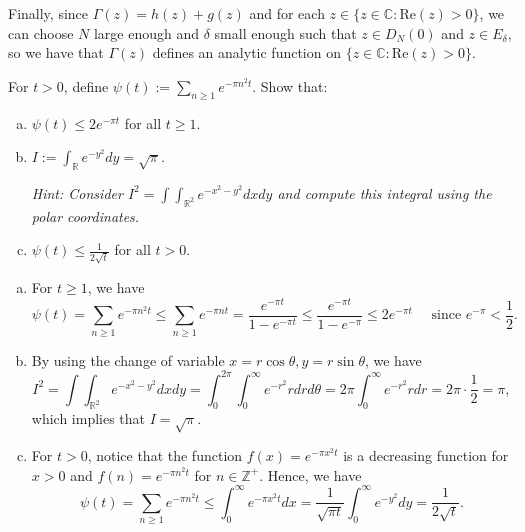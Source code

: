 \documentclass{elegantbook}
\begin{document}
\begin{problemset}[Exercises]
\begin{solution}
    Finally, since $\Gamma(z) = h(z) + g(z)$ and for each $z\in\{z\in\mathbb{C} : \mathrm{Re}(z) > 0\}$, we can choose $N$ large enough and $\delta$ small enough such that $z\in D_{N}(0)$ and $z\in E_{\delta}$, so we have that $\Gamma(z)$ defines an analytic function on $\{z\in\mathbb{C} : \mathrm{Re}(z) > 0\}$.
  \end{solution}

  \item For $t>0$, define $\psi(t) := \sum_{n\geq 1}e^{-\pi n^2 t}$. Show that:
  \begin{enumerate}[(a)]
    \item $\psi(t) \leq 2e^{-\pi t}$ for all $t\geq1$.
    \item $I := \int_{\mathbb{R}} e^{-y^2} dy = \sqrt{\pi}$.
    
    \textit{Hint: Consider $I^2=\int\int_{\mathbb{R}^2} e^{-x^2-y^2} dx dy$ and compute this integral using the polar coordinates.}
    
    \item $\psi(t) \leq \frac{1}{2\sqrt{t}}$ for all $t>0$.
  \end{enumerate}

  \begin{solution}
    \begin{enumerate}[(a)]
      \item For $t\geq 1$, we have
      \[
        \psi(t) = \sum_{n\geq 1}e^{-\pi n^2 t} \leq \sum_{n\geq 1}e^{-\pi n t} = \frac{e^{-\pi t}}{1-e^{-\pi t}} \leq \frac{e^{-\pi t}}{1-e^{-\pi}} \leq 2e^{-\pi t} \quad \text{ since } e^{-\pi} < \frac{1}{2}.
      \]

      \item By using the change of variable $x=r\cos\theta, y=r\sin\theta$, we have
      \[
        I^2 = \int\int_{\mathbb{R}^2} e^{-x^2-y^2} dx dy = \int_{0}^{2\pi} \int_{0}^{\infty} e^{-r^2} r dr d\theta = 2\pi \int_{0}^{\infty} e^{-r^2} r dr = 2\pi \cdot \frac{1}{2} = \pi,
      \]
      which implies that $I = \sqrt{\pi}$.

      \item For $t>0$, notice that the function $f(x) = e^{-\pi x^2 t}$ is a decreasing function for $x>0$ and $f(n) = e^{-\pi n^2 t}$ for $n\in\mathbb{Z}^+$. Hence, we have
      \[
        \psi(t) = \sum_{n\geq 1}e^{-\pi n^2 t} \leq \int_{0}^{\infty} e^{-\pi x^2 t} dx = \frac{1}{\sqrt{\pi t}} \int_{0}^{\infty} e^{-y^2} dy = \frac{1}{2\sqrt{t}}.
      \]
    \end{enumerate}
  \end{solution}


\end{problemset}
\end{document}
